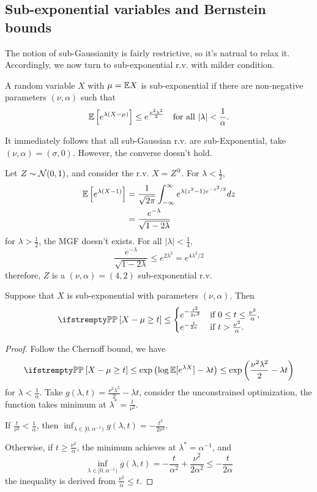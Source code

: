 \documentclass{paper}
\begin{document}
\subsection{Sub-exponential variables and Bernstein bounds}
The notion of sub-Gaussianity is fairly restrictive, so it's natrual to relax it. Accordingly, we now turn to sub-exponential r.v. with milder condition.
\begin{defn}
	A random variable $X$ with $\mu=\mathbb{E} X$ is sub-exponential if there are non-negative parameters $(\nu,\alpha)$ such that
	\[
		\mathbb{E}\left[e^{\lambda(X-\mu)}\right]\leq e^{\frac{\nu^2 \lambda^2}{2}} \quad \text{for all } \vert \lambda\vert < \frac{1}{\alpha}.
	\]
\end{defn}
It immediately follows that all sub-Gaussian r.v. are sub-Exponential, take $(\nu, \alpha) = (\sigma, 0)$. However, the converse doesn't hold.
\begin{exmp}
	Let $Z\sim\mathcal{N}(0, 1)$, and consider the r.v. $X=Z^@$. For $\lambda<\frac{1}{2}$,
	\begin{align*}
		\mathbb{E}\left[e^{\lambda(X-1)}\right] & = \frac{1}{\sqrt{2\pi}}\int_{-\infty}^{\infty}e^{\lambda (z^2-1)e^{-z^2/2}} dz \\
		                                 & =\frac{e^{-\lambda}}{\sqrt{1-2\lambda}}
	\end{align*}
	for $\lambda>\frac{1}{2}$, the MGF doesn't exists. For all $\vert \lambda\vert<\frac{1}{4}$,
	\[
		\frac{e^{-\lambda}}{\sqrt{1-2\lambda}} \leq e^{2\lambda^2} = e^{4\lambda^2/2}
	\]
	therefore, $Z$ is a $(\nu, \alpha) = (4, 2)$ sub-exponential r.v.
\end{exmp}
\begin{prop}
	Suppose that $X$ is sub-exponential with parameters $(\nu,\alpha)$. Then
	\[
		\PP\left[X-\mu \geq t\right] \leq
		\begin{cases}
			e^{-\frac{t^2}{2\nu^2}} & \text{if } 0 \leq t \leq \frac{\nu^2}{\alpha}, \\
			e^{-\frac{t}{2\alpha}}  & \text{if } t > \frac{\nu^2}{\alpha}.
		\end{cases}
	\]
\end{prop}
\begin{proof}
	Follow the Chernoff bound, we have
	\[
		\PP\left[X-\mu\geq t\right] \leq \exp\left(\log\EE[e^{\lambda X}] - \lambda t\right) \leq \exp\left( \frac{\nu^2\lambda^2}{2} - \lambda t\right)
	\]
	for $\lambda< \frac{1}{\alpha}$. Take $g(\lambda, t) = \frac{\nu^2\lambda^2}{2}-\lambda t$, consider the unconstrained optimization, the function takes minimum at $\lambda^*= \frac{t}{\nu^2}$.

	If $\frac{t}{\nu^2} < \frac{1}{\alpha}$, then $\displaystyle\inf_{\lambda\in[0,\alpha^{-1})}g(\lambda, t) = -\frac{t^2}{2\nu^2}$.

	Otherwise, if $t \geq \frac{\nu^2}{\alpha}$, the minimum achieves at $\lambda^*=\alpha^{-1}$, and
	\[
		\inf_{\lambda\in[0,\alpha^{-1})} g(\lambda, t) = -\frac{t}{\alpha^2} + \frac{\nu^2}{2\alpha^2}\leq -\frac{t}{2\alpha}
	\]
	the inequality is derived from $\frac{\nu^2}{\alpha}\leq t$.
\end{proof}
\end{document}

